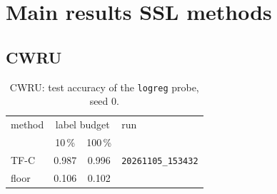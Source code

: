 
\chapter{Main results SSL methods}


\section{CWRU}
\begin{table}[h]
\centering
\begin{tabular}{lccl}
\toprule
method & \multicolumn{2}{c}{label budget} & run \\
 & 10\,\% & 100\,\% & \\
\midrule
TF-C & 0.987 & 0.996 & \texttt{\footnotesize 20261105\_153432} \\
\midrule
floor & 0.106 & 0.102 & \\
\bottomrule
\end{tabular}
\caption{CWRU: test accuracy of the \texttt{logreg} probe, seed 0.}
\end{table}

